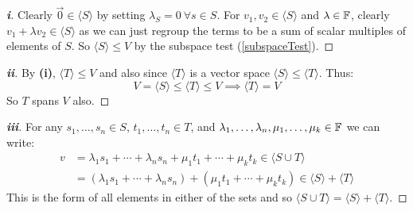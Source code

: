 \documentclass[../main.tex]{subfiles}
\begin{document}
\begin{proof}[\textbf{i}]
  Clearly $\vec{0} \in \langle S \rangle$ by setting $\lambda_S = 0\ \forall s \in S$.
  For $v_1, v_2 \in \langle S \rangle$ and $\lambda \in \mathbb{F}$, clearly $v_1 + \lambda v_2 \in \langle S \rangle$ as we can just regroup the terms to be a sum of scalar multiples of elements of $S$.
  So $\langle S \rangle \leq V$ by the subspace test (\cref{subspaceTest}).
\end{proof}
\begin{proof}[\textbf{ii}]
  By \textbf{(i)}, $\langle T \rangle \leq V$ and also since $\langle T \rangle$ is a vector space $\langle S \rangle \leq \langle T \rangle$.
  Thus:
  \[
    V = \langle S \rangle \leq \langle T \rangle \leq V \implies \langle T \rangle = V
  \]
  So $T$ spans $V$ also.
\end{proof}
\begin{proof}[\textbf{iii}]
  For any $s_1, \ldots, s_n \in S$, $t_1, \ldots, t_n \in T$, and $\lambda_1, \ldots, \lambda_n, \mu_1, \ldots, \mu_k \in \mathbb{F}$ we can write:
  \begin{align*}
    v &= \lambda_1 s_1 + \cdots + \lambda_n s_n + \mu_1 t_1 + \cdots + \mu_k t_k \in \langle S \cup T \rangle\\
      &= (\lambda_1 s_1 + \cdots + \lambda_n s_n) + (\mu_1 t_1 + \cdots + \mu_k t_k) \in \langle S \rangle + \langle T \rangle
  \end{align*}
  This is the form of all elements in either of the sets and so $\langle S \cup T \rangle = \langle S \rangle + \langle T \rangle$.
\end{proof}
\end{document}
